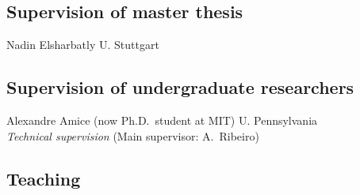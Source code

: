 \documentclass{cvlfoc}
\begin{document}

\subsection*{Supervision of master thesis}

\begin{entrydate}
		{Nadin Elsharbatly \hfill U. Stuttgart}
\end{entrydate}


\subsection*{Supervision of undergraduate researchers}

\begin{entrydate}
		{Alexandre Amice {\small (now Ph.D.\ student at MIT)}
		\hfill U. Pennsylvania\\
		\emph{Technical supervision} \hfill(Main supervisor: A.\ Ribeiro)}
\end{entrydate}


%


\subsection*{Teaching}
\end{document}
